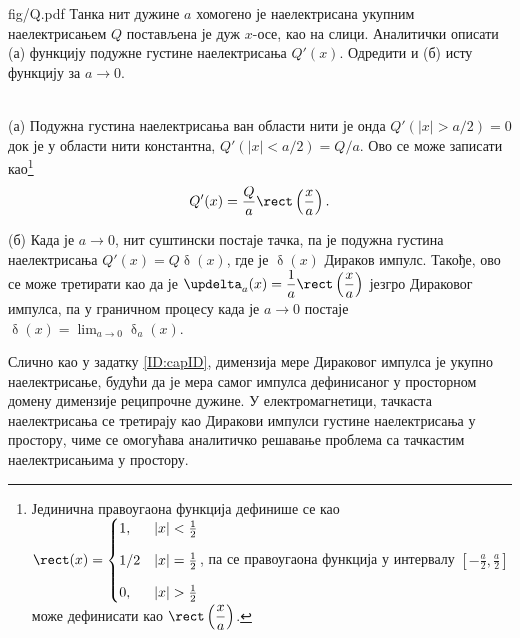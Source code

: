 \noindent
\begin{slikaDesno}[0.833]{fig/Q.pdf}\noindent
\PID 
Танка нит дужине $a$ хомогено је наелектрисана укупним 
наелектрисањем $Q$ постављена је дуж $x$-осе, као на слици. 
Аналитички описати (а) функцију подужне густине 
наелектрисања $Q'(x)$. Одредити и (б) исту функцију за
$a \to 0$. 
\end{slikaDesno} \\[2mm]

\RESENJE 
(а) Подужна густина наелектрисања ван области нити је онда 
    $Q'(|x| > a/2) = 0$ док је у области нити константна, $Q'(|x| < a/2) = Q/a$.
    Ово се може записати као\footnote{ Јединична правоугаона функција дефинише се као \vspace*{1mm}
    $\rect(x) = \begin{cases}
        1, & |x| < \frac12 \\[3mm]
        1/2 & |x| = \frac{1}{2} \\[3mm]
        0, & |x| > \frac12 \end{cases}$, 
        па се правоугаона функција у интервалу $\displaystyle \left[-\frac{a}{2}, \frac{a}{2}\right]$ може дефинисати као
        $\rect\left(\dfrac{x}{a}\right)$.}
    \begin{equation}
        Q'(x) = \dfrac{Q}{a} \rect\left(\dfrac{x}{a}\right).
    \end{equation}
    
(б) Када је $a \to 0$, нит суштински постаје тачка, па је подужна густина наелектрисања
    $Q'(x) = Q \updelta(x)$, где је $\updelta(x)$ Дираков импулс. Такође, ово се може третирати као да је 
    $\updelta_a(x) = \dfrac{1}{a} \rect\left(\dfrac{x}{a}\right)$ језгро Дираковог импулса, па у граничном процесу 
    \vspace*{1mm}
    када је $a \to 0$ постаје $\updelta(x) = \lim_{a \to 0} \updelta_a(x)$.

Слично као у задатку \ref{ID:capID}, димензија мере Дираковог импулса је укупно наелектрисање, будући да је мера
самог импулса дефинисаног у просторном домену димензије реципрочне дужине. 
У електромагнетици, тачкаста наелектрисања се третирају као Диракови импулси густине наелектрисања у простору, чиме се 
    омогућава аналитичко решавање проблема са тачкастим наелектрисањима у простору.